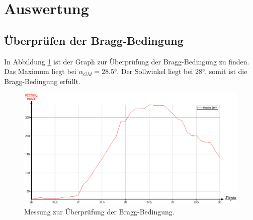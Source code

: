 \section{Auswertung}
\subsection{Überprüfen der Bragg-Bedingung}
In Abbildung \ref{fig:1} ist der Graph zur Überprüfung der Bragg-Bedingung zu finden.
Das Maximum liegt bei $\alpha_{GM} = 28.5°$. Der Sollwinkel liegt bei 28°, somit ist
die Bragg-Bedingung erfüllt.
\begin{figure}
  \centering
  \includegraphics[scale=0.2]{bragg.png}
  \caption{Messung zur Überprüfung der Bragg-Bedingung.}
  \label{fig:1}
\end{figure}

